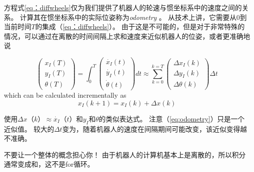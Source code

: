 方程式\ref {eq：diffwheels}仅为我们提供了机器人的轮速与惯坐标系中的速度之间的关系。 计算其在惯坐标系中的实际位姿称为\emph {odometry} 。 从技术上讲，它需要从0到当前时间$ T $的集成（\ref {eq：diffwheels}）。 由于这是不可能的，但是对于非常特殊的情况，可以通过在离散的时间间隔上求和速度来近似机器人的位姿，或者更准确地说

\begin{equation}
\left(\begin{array}{c} {x_I}(T)\\{y_I}(T)\\{\theta}(T)\end{array}\right)=
\int_0^T \left(\begin{array}{c} \dot{x_I}(t)\\\dot{y_I}(t)\\\dot{\theta}(t)\end{array}\right) dt \approx 
\sum_{k=0}^{k=T}\left(\begin{array}{c} \Delta{x_I}(k)\\\Delta{y_I}(k)\\\Delta{\theta}(k)\end{array}\right)\Delta t
\end{equation} which can be calculated incrementally as
\begin{equation}\label{eq:odometry}
x_I(k+1)=x_I(k)+\Delta x (k)
\end{equation}

使用$ \Delta x（k）\approx\dot {x_I}（t）$和$ y_I $和$ \theta $的类似表达式。 注意（\ref{eq:odometry}）只是一个近似值。 较大的$ \Delta t $变为，随着机器人的速度在间隔期间可能改变，该近似变得越不准确。

\begin{framed}

不要让一个整体的概念担心你！ 由于机器人的计算机基本上是离散的，所以积分通常变成和，这不是for循环。
\end{framed}




